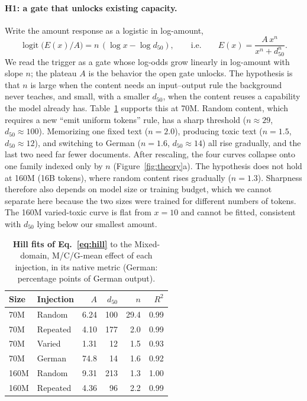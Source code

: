 \documentclass{article} %
\begin{document}
\paragraph{H1: a gate that unlocks existing capacity.}
Write the amount response as a logistic in log-amount,
\begin{equation}
\operatorname{logit}\!\big(E(x)/A\big) = n\,(\log x-\log d_{50}),
\qquad\text{i.e.}\qquad E(x)=\frac{A\,x^{n}}{x^{n}+d_{50}^{n}}.
\label{eq:hill}
\end{equation}
We read the trigger as a gate whose log-odds grow linearly in log-amount with slope $n$; the plateau $A$ is the behavior the open gate unlocks. The hypothesis is that $n$ is large when the content needs an input--output rule the background never teaches, and small, with a smaller $d_{50}$, when the content reuses a capability the model already has. Table~\ref{tab:hill} supports this at 70M. Random content, which requires a new ``emit uniform tokens'' rule, has a sharp threshold ($n\approx29$, $d_{50}\approx100$). Memorizing one fixed text ($n=2.0$), producing toxic text ($n=1.5$, $d_{50}\approx12$), and switching to German ($n=1.6$, $d_{50}\approx14$) all rise gradually, and the last two need far fewer documents. After rescaling, the four curves collapse onto one family indexed only by $n$ (Figure~\ref{fig:theory}a). The hypothesis does not hold at 160M (16B tokens), where random content rises gradually ($n=1.3$). Sharpness therefore also depends on model size or training budget, which we cannot separate here because the two sizes were trained for different numbers of tokens. The 160M varied-toxic curve is flat from $x{=}10$ and cannot be fitted, consistent with $d_{50}$ lying below our smallest amount.

\begin{table}[h]
\centering
\small
\caption{\textbf{Hill fits of Eq.~\eqref{eq:hill}} to the Mixed-domain, M/C/G-mean effect of each injection, in its native metric (German: percentage points of German output).}
\label{tab:hill}
\begin{tabular}{llrrrr}
\toprule
Size & Injection & $A$ & $d_{50}$ & $n$ & $R^2$ \\
\midrule
70M  & Random & 6.24 & 100 & 29.4 & 0.99 \\
70M  & Repeated & 4.10 & 177 & 2.0 & 0.99 \\
70M  & Varied   & 1.31 & 12  & 1.5 & 0.93 \\
70M  & German & 74.8 & 14  & 1.6 & 0.92 \\
160M & Random & 9.31 & 213 & 1.3 & 1.00 \\
160M & Repeated & 4.36 & 96  & 2.2 & 0.99 \\
\bottomrule
\end{tabular}
\end{table}
\end{document}

